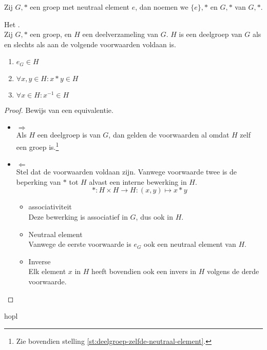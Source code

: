 \documentclass[main.tex]{subfiles}
\begin{document}
\begin{de}
  Zij $G,*$ een groep met neutraal element $e$, dan noemen we $\{e\},*$ en $G,*$  van $G,*$.
\end{de}

\begin{st}
  \label{st:criterium-deelgroep}
  Het .\\
  Zij $G,*$ een groep, en $H$ een deelverzameling van $G$.
  $H$ is een deelgroep van $G$ als en slechts als aan de volgende voorwaarden voldaan is.
  \begin{enumerate}
  \item $e_{G} \in H$
  \item $\forall x,y \in H: x * y \in H$
  \item $\forall x \in H: x^{-1} \in H$
  \end{enumerate}

  \begin{proof}
    Bewijs van een equivalentie.
    \begin{itemize}
    \item $\Rightarrow$\\
      Als $H$ een deelgroep is van $G$, dan gelden de voorwaarden al omdat $H$ zelf een groep is.\footnote{Zie bovendien stelling \ref{st:deelgroep-zelfde-neutraal-element}.}
    \item $\Leftarrow$\\
      Stel dat de voorwaarden voldaan zijn. Vanwege voorwaarde twee is de beperking van $*$ tot $H$ alvast een interne bewerking in $H$.
      \[ *: H \times H \rightarrow H: (x,y) \mapsto x*y \]
      \begin{itemize}
      \item associativiteit\\
      Deze bewerking is associatief in $G$, dus ook in $H$.
      \item Neutraal element\\
      Vanwege de eerste voorwaarde is $e_{G}$ ook een neutraal element van $H$.
      \item Inverse\\
      Elk element $x$ in $H$ heeft bovendien ook een invers in $H$ volgens de derde voorwaarde.
      \end{itemize}
    \end{itemize}
  \end{proof}
\end{st}
hopl
\end{document}
